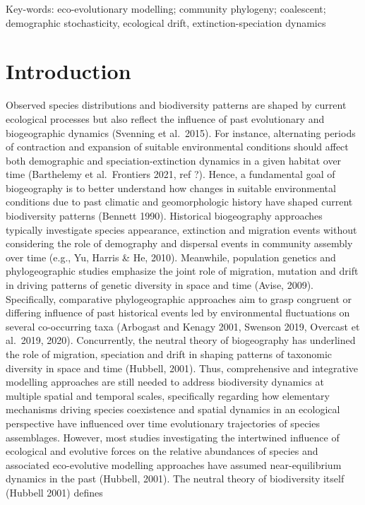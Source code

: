 \documentclass[
]{article}
\begin{document}
Key-words: eco-evolutionary modelling; community phylogeny; coalescent;
demographic stochasticity, ecological drift, extinction-speciation
dynamics

\hypertarget{introduction}{%
\section{Introduction}\label{introduction}}

Observed species distributions and biodiversity patterns are shaped by
current ecological processes but also reflect the influence of past
evolutionary and biogeographic dynamics (Svenning et al.~2015). For
instance, alternating periods of contraction and expansion of suitable
environmental conditions should affect both demographic and
speciation-extinction dynamics in a given habitat over time (Barthelemy
et al.~Frontiers 2021, ref ?). Hence, a fundamental goal of biogeography
is to better understand how changes in suitable environmental conditions
due to past climatic and geomorphologic history have shaped current
biodiversity patterns (Bennett 1990). Historical biogeography approaches
typically investigate species appearance, extinction and migration
events without considering the role of demography and dispersal events
in community assembly over time (e.g., Yu, Harris \& He, 2010).
Meanwhile, population genetics and phylogeographic studies emphasize the
joint role of migration, mutation and drift in driving patterns of
genetic diversity in space and time (Avise, 2009). Specifically,
comparative phylogeographic approaches aim to grasp congruent or
differing influence of past historical events led by environmental
fluctuations on several co-occurring taxa (Arbogast and Kenagy 2001,
Swenson 2019, Overcast et al.~2019, 2020). Concurrently, the neutral
theory of biogeography has underlined the role of migration, speciation
and drift in shaping patterns of taxonomic diversity in space and time
(Hubbell, 2001). Thus, comprehensive and integrative modelling
approaches are still needed to address biodiversity dynamics at multiple
spatial and temporal scales, specifically regarding how elementary
mechanisms driving species coexistence and spatial dynamics in an
ecological perspective have influenced over time evolutionary
trajectories of species assemblages. However, most studies investigating
the intertwined influence of ecological and evolutive forces on the
relative abundances of species and associated eco-evolutive modelling
approaches have assumed near-equilibrium dynamics in the past (Hubbell,
2001). The neutral theory of biodiversity itself (Hubbell 2001) defines
\end{document}
